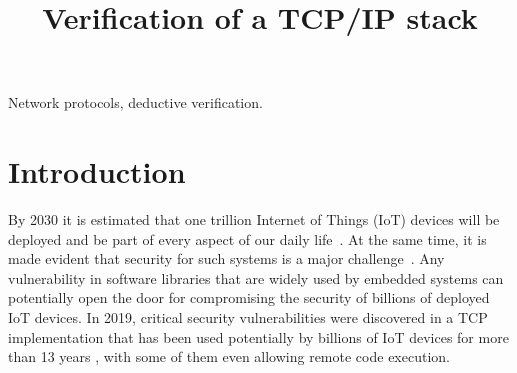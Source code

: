 \documentclass[conference]{IEEEtran}
\begin{document}
\title{Verification of a TCP/IP stack}

\author{%
\and
{}
\and
{}
\and
{}
}

\maketitle

\begin{abstract}
\end{abstract}

\begin{IEEEkeywords}
Network protocols,
deductive verification.
\end{IEEEkeywords}

\section{Introduction}

By 2030 it is estimated that one trillion Internet of Things (IoT) devices will be deployed and be part of every aspect of our daily life~\cite{IoT_route:ARM_white_paper}. At the same time, it is made evident that security for such systems is a major challenge~\cite{Sec_IoT_Challenges:paper,Cyber_Systems_security:paper}. Any vulnerability in software libraries that are widely used by embedded systems can potentially open the door for compromising the security of billions of deployed IoT devices. In 2019, critical security vulnerabilities were discovered in a TCP implementation that has been used potentially by billions of IoT devices for more than 13 years \cite{zero_days_vuln:ARMIS_white_paper}, with some of them even allowing remote code execution.
\end{document}
